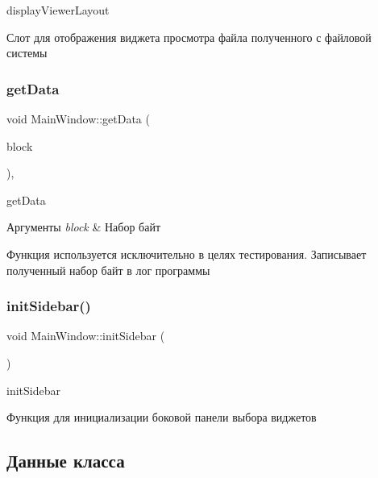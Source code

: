 display\+Viewer\+Layout 

Слот для отображения виджета просмотра файла полученного с файловой системы \mbox{\label{classMainWindow_a3da5047b0ff5cf5c10a20174a99c420c}} 
\subsubsection{\texorpdfstring{get\+Data}{getData}}
{\footnotesize\ttfamily void Main\+Window\+::get\+Data (\begin{DoxyParamCaption}\item[{Q\+Byte\+Array}]{block }\end{DoxyParamCaption})\hspace{0.3cm}{\ttfamily [private]}, {\ttfamily [slot]}}



get\+Data 


\begin{DoxyParams}{Аргументы}
{\em block} & Набор байт\\
\hline
\end{DoxyParams}
Функция используется исключительно в целях тестирования. Записывает полученный набор байт в лог программы \mbox{\label{classMainWindow_a3dea38a93f87d0ee9452035a4c9b8b7b}} 
\subsubsection{\texorpdfstring{init\+Sidebar()}{initSidebar()}}
{\footnotesize\ttfamily void Main\+Window\+::init\+Sidebar (\begin{DoxyParamCaption}{ }\end{DoxyParamCaption})}



init\+Sidebar 

Функция для инициализации боковой панели выбора виджетов 

\subsection{Данные класса}
\mbox{\label{classMainWindow_a06968aebc42a16ab51c5888b4784075d}} 
